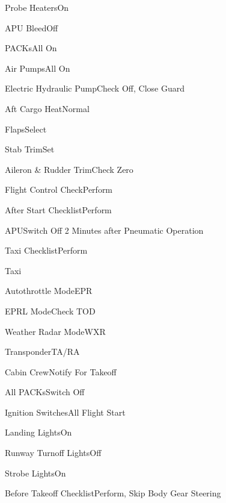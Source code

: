 \documentclass[sim-use, blue_items]{checklist}
\begin{document}
\begin{continuedchecklist}
	\item{Probe Heaters}{On}
	\item{APU Bleed}{Off}
	\item{PACKs}{All On}
	\item{Air Pumps}{All On}
	\item{Electric Hydraulic Pump}{Check Off, Close Guard}
	\item{Aft Cargo Heat}{Normal}
	\item{Flaps}{Select}
	\item{Stab Trim}{Set}
	\item{Aileron \& Rudder Trim}{Check Zero}
	\item{Flight Control Check}{Perform}
	\item{After Start Checklist}{Perform}
	\item{APU}{Switch Off 2 Minutes after Pneumatic Operation}
	\item{Taxi Checklist}{Perform}
\end{continuedchecklist}

\begin{checklist}{Taxi}
	 {
		\item{Autothrottle Mode}{EPR}
		\item{EPRL Mode}{Check TOD}
		\item{Weather Radar Mode}{WXR}
		\item{Transponder}{TA/RA}
		\item{Cabin Crew}{Notify For Takeoff}
	}
	 {
		\item{All PACKs}{Switch Off}
		\item{Ignition Switches}{All Flight Start}
		\item{Landing Lights}{On}
		\item{Runway Turnoff Lights}{Off}
		\item{Strobe Lights}{On}
		\item{Before Takeoff Checklist}{Perform, Skip Body Gear Steering}
	}
\end{checklist}
\end{document}

